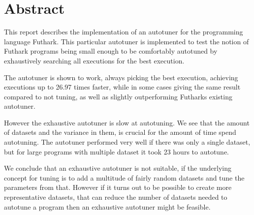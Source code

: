 \section*{Abstract}
This report describes the implementation of an autotuner for the programming
language Futhark. This particular autotuner is implemented to test the notion
of Futhark programs being small enough to be comfortably autotuned by
exhaustively searching all executions for the best execution. 

The autotuner is shown to work, always picking the best execution, achieving
executions up to 26.97 times faster, while in some cases giving the same result
compared to not tuning, as well as slightly outperforming Futharks existing
autotuner.

However the exhaustive autotuner is slow at autotuning. We see that the amount
of datasets and the variance in them, is crucial for the amount of time spend
autotuning. The autotuner performed very well if there was only a single
dataset, but for large programs with multiple dataset it took 23 hours to
autotune. 

We conclude that an exhaustive autotuner is not suitable, if the underlying concept for tuning
is to add a multitude of fairly random datasets and tune the parameters from that. 
However if it turns out to be possible to create more representative datasets,
that can reduce the number of datasets needed to autotune a program
then an exhaustive autotuner might be feasible. 

